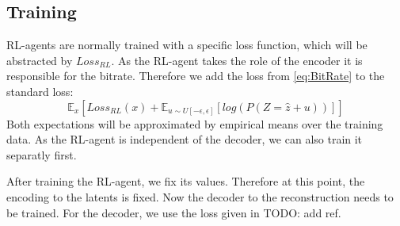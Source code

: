     

    
    


    




\subsection{Training}
    RL-agents are normally trained with a specific loss function, which will be
    abstracted by $Loss_{RL}$. As the RL-agent takes the role of the encoder it
    is responsible for the bitrate. Therefore we add the loss from
    \ref{eq:BitRate} to the standard loss:
    \begin{equation}
        \mathbb{E}_{x}[Loss_{RL}(x) + \mathbb{E}_{u \sim U[-\epsilon, \epsilon]}[log(P(Z=\hat{z} + u))]]
    \end{equation}
    Both expectations will be approximated by empirical means over the training
    data. As the RL-agent is independent of the decoder, we can also train it
    separatly first.

    After training the RL-agent, we fix its values. Therefore at this point, the
    encoding to the latents is fixed. Now the decoder to the reconstruction
    needs to be trained. For the decoder, we use the loss given in TODO: add ref. 

